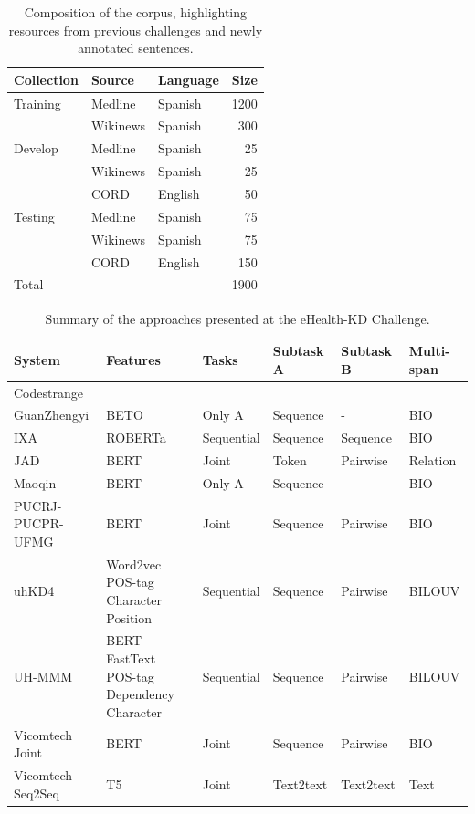 \documentclass[a4paper,11pt,twocolumn,twoside]{article}
\begin{document}
\begin{table}
  \begin{tabular}{lllr}
    \toprule
    \textbf{Collection} & \textbf{Source} & \textbf{Language} & \textbf{Size} \\
    \midrule
    Training & Medline & Spanish & 1200 \\
             & Wikinews & Spanish & 300 \\
    \midrule
    Develop & Medline & Spanish & 25 \\
            & Wikinews & Spanish & 25 \\
            & CORD & English & 50 \\
    \midrule
    Testing & Medline & Spanish & 75 \\
            & Wikinews & Spanish & 75 \\
            & CORD & English & 150 \\
    \midrule
    Total   &      &         & 1900 \\
    \bottomrule
  \end{tabular}
  \caption{Composition of the corpus, highlighting resources from previous
  challenges and newly annotated sentences.\label{tab:corpus}}
\end{table}

\begin{table}[t!]
  \centering
  \begin{tabularx}{\textwidth}{lXllll}
    \toprule
    System & Features & Tasks & Subtask A & Subtask B & Multi-span \\
    \midrule
    Codestrange & 				 \\
    GuanZhengyi & BETO & Only A & Sequence & - & BIO \\
    IXA & ROBERTa & Sequential & Sequence & Sequence & BIO \\
    JAD & BERT & Joint & Token & Pairwise & Relation \\
    Maoqin & BERT & Only A & Sequence & - & BIO \\
    PUCRJ-PUCPR-UFMG & BERT & Joint & Sequence & Pairwise & BIO \\
    uhKD4 & Word2vec POS-tag Character Position & Sequential & Sequence & Pairwise & BILOUV \\
    UH-MMM & BERT FastText POS-tag Dependency Character & Sequential & Sequence & Pairwise & BILOUV \\
    Vicomtech Joint & BERT & Joint & Sequence & Pairwise & BIO \\
    Vicomtech Seq2Seq & T5 & Joint & Text2text & Text2text & Text \\
    \bottomrule
  \end{tabularx}
  \caption{Summary of the approaches presented at the eHealth-KD Challenge.\label{tab:participants}}
\end{table}
\end{document}
